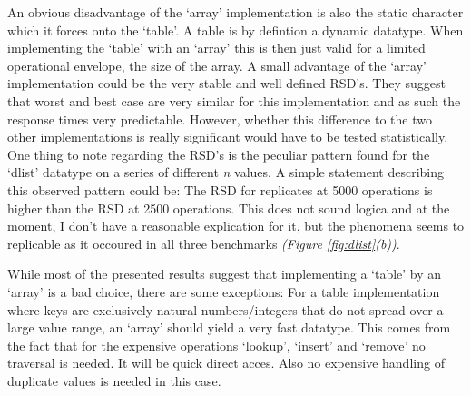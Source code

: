 \documentclass[a4paper,11pt,twoside]{article}
\begin{document}
An obvious disadvantage of the `array' implementation is also the
static character which it forces onto the `table'. A table is by 
defintion a dynamic datatype. When implementing the `table' with an
`array' this is then just valid for a limited operational envelope,
the size of the array. A small advantage of the `array' implementation 
could be the very stable and well defined RSD's. They suggest that 
worst and best case are very similar for this implementation and as 
such the response times very predictable. However, whether this difference to the two
other implementations is really significant would have to be tested
statistically. One thing to note regarding the RSD's is the peculiar
pattern found for the `dlist' datatype on a series of different
\textit{n} values. A simple statement describing this observed pattern
could be: The RSD for replicates at 5000 operations is higher than the
RSD at 2500 operations. This does not sound logica and at the moment, 
I don't have a reasonable explication for it, but the phenomena seems
to replicable as it occoured in all three benchmarks 
\textit{(Figure \ref{fig:dlist}(b))}.

While most of the presented results suggest that implementing a
`table' by an `array' is a bad choice, there are some
exceptions: For a table implementation where keys are exclusively 
natural numbers/integers that do not spread over a large value range, 
an `array' should yield a very fast datatype. This comes from the fact
that for the expensive operations `lookup', `insert' and `remove' no
traversal is needed. It will be quick direct acces. Also no expensive
handling of duplicate values is needed in this case.  


\end{document}
